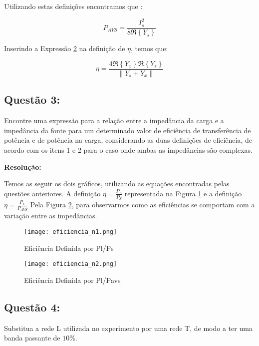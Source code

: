 \documentclass[a4paper,12pt]{proc}
\begin{document}
\noindent Utilizando estas definições encontramos que :

\begin{equation}
    P_{AVS} = \frac{I_{s}^{2}}{8 \Re\left \{ Y_{s} \right \}}
    \label{pavs_teo}
\end{equation}

\noindent Inserindo a Expressão \ref{pavs_teo} na definição de $\eta$, temos que:

\begin{equation}
    \eta = \frac{4\Re\left \{ Y_{x}\right \}\Re\left \{ Y_{s} \right \}}{\left \| Y_{s} + Y_{x} \right \|}
    \label{etapavs}
\end{equation}

\subsection{Questão 3:}

Encontre uma expressão para a relação entre a impedância da carga e a impedância da fonte para um determinado valor de
eficiência de transferência de potência e de potência na carga, considerando as duas definições de eficiência, de acordo com
os itens 1 e 2 para o caso onde ambas as impedâncias são complexas.

\singlespacing

\textbf{Resolução:}

\singlespacing

\noindent Temos as seguir os dois gráficos, utilizando as equações encontradas pelas questões anteriores. A definição $\eta = \frac
{P_{L}}{P_{S}}$ representada na Figura \ref{ps_teo} e a definição $\eta = \frac{P_{L}}{P_{AVS}}$ Pela Figura \ref{pavs_teo}, para observarmos como as eficiências se comportam com a variação entre as impedâncias.


\begin{figure}[htbp]
    \centering
    \texttt{[image: eficiencia\_n1.png]}
    \caption{Eficiência Definida por Pl/Ps}
    \label{ps_teo}
\end{figure}

\begin{figure}[htbp]
    \centering
    \texttt{[image: eficiencia\_n2.png]}
    \caption{Eficiência Definida por Pl/Pavs}
    \label{pavs_teo}
\end{figure}


\subsection{Questão 4:}
Substitua a rede L utilizada no experimento por uma rede T, de modo a ter uma banda passante de $10\%$.
\end{document}
